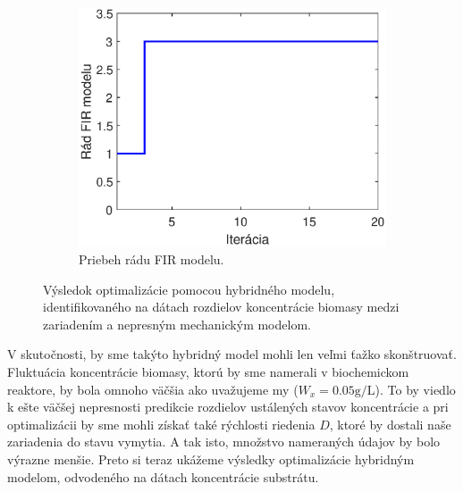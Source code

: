 \begin{figure}
\begin{subfigure}[b]{0.49\textwidth}
	\end{subfigure}
	\bigskip
	\begin{subfigure}[b]{0.49\textwidth}
		\centering
		\includegraphics[width=\linewidth]{images/hybrid_bio_order}
		\caption{Priebeh rádu FIR modelu.}
		\label{fig:hybrid_bio_order}
	\end{subfigure}
	\caption{Výsledok optimalizácie pomocou hybridného modelu, identifikovaného na dátach rozdielov koncentrácie biomasy medzi zariadením a nepresným mechanickým modelom.}
	\label{fig:hybrid_bio_opt_results}	
\end{figure}

V skutočnosti, by sme takýto hybridný model mohli len veľmi ťažko skonštruovať. Fluktuácia koncentrácie biomasy, ktorú by sme namerali v biochemickom reaktore, by bola omnoho väčšia ako uvažujeme my ($ W_{x} = 0.05\si{\gram\per\liter} $). To by viedlo k ešte väčšej nepresnosti predikcie rozdielov ustálených stavov koncentrácie a pri optimalizácii by sme mohli získať také rýchlosti riedenia $ D $, ktoré by dostali naše zariadenia do stavu vymytia. A tak isto, množstvo nameraných údajov by bolo výrazne menšie. Preto si teraz ukážeme výsledky optimalizácie hybridným modelom, odvodeného na dátach koncentrácie substrátu. 

